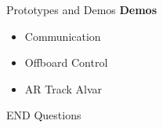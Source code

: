 \documentclass[11pt]{beamer}
\begin{document}


\begin{frame}{Prototypes and Demos}
\large{\textbf{Demos}}
\begin{itemize}
	\item Communication
	\item Offboard Control
	\item AR Track Alvar
\end{itemize}

\end{frame}



\begin{frame}{ END}
\centering	Questions
\end{frame}
\end{document}
